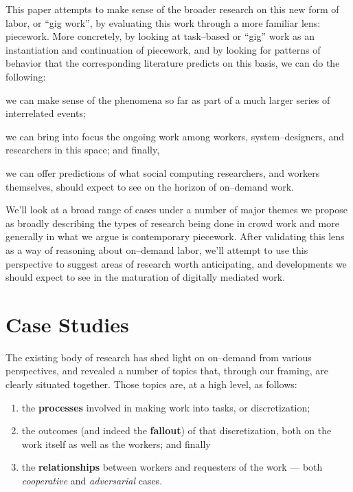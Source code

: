 \documentclass{sigchi}
\begin{document}
This paper attempts to make sense of the broader research on this new form of labor,
or ``gig work'', by evaluating this work through a more familiar lens: piecework.
More concretely, by looking at task--based or ``gig'' work as
an instantiation and continuation of piecework,
and by looking for patterns of behavior that the corresponding literature predicts
on this basis, we can do the following:
\begin{inlinelist}
  \item we can make sense of the phenomena so far as part of a much larger series of interrelated events;
  \item we can bring into focus the ongoing work among workers, system--designers, and researchers in this space; and finally,
  \item we can offer predictions of what social computing researchers, and workers themselves, should expect to see on the horizon of on--demand work.
\end{inlinelist}

We'll look at a broad range of cases under a number of major themes
we propose as broadly describing the types of research being done in crowd work
and more generally in what we argue is contemporary piecework.
After validating this lens as a way of reasoning about on--demand labor,
we'll attempt to use this perspective to suggest areas of research worth anticipating,
and developments we should expect to see in the maturation of digitally mediated work.

\section{Case Studies}
The existing body of research has shed light on on--demand from various perspectives,
and revealed a number of topics that,
through our framing, are clearly situated together.
Those topics are, at a high level, as follows:
\begin{enumerate}
\item the \textbf{processes} involved in making work into tasks, or discretization;
\item the outcomes (and indeed the \textbf{fallout}) of that discretization,
both on the work itself as well as the workers;
and finally
\item the \textbf{relationships} between workers and requesters of the work
--- both \textit{cooperative} and \textit{adversarial} cases.
\end{enumerate}
\end{document}
